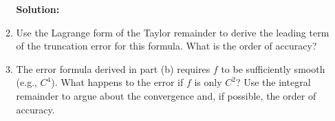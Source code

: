 \documentclass{article}
\theoremstyle{definition}
\theoremstyle{remark}
\begin{document}
\begin{enumerate}
\begin{enumerate}
        \textbf{Solution:} 
    
        \item Use the Lagrange form of the Taylor remainder to derive the leading term of the truncation error for this formula. What is the order of accuracy?
    
        \item The error formula derived in part (b) requires $f$ to be sufficiently smooth (e.g., $C^4$). What happens to the error if $f$ is only $C^2$? Use the integral remainder to argue about the convergence and, if possible, the order of accuracy.
    \end{enumerate}
    

\end{enumerate}
\end{document}
